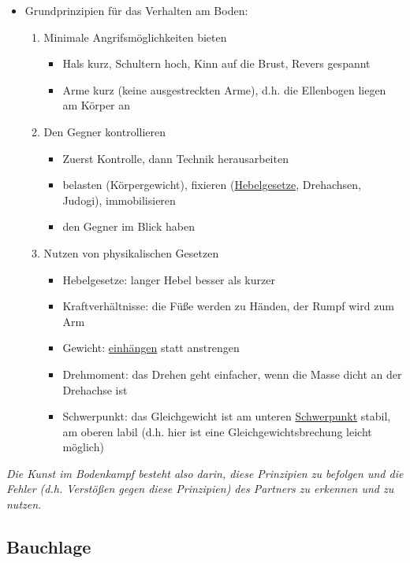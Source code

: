 \documentclass[justified, a4paper, notitlepage, captions=tableheading, nobib]{tufte-handout}
\begin{document}
\begin{itemize}
\item Grundprinzipien für das Verhalten am Boden:
\begin{enumerate}
\item Minimale Angrifsmöglichkeiten bieten
\begin{itemize}
\item Hals kurz, Schultern hoch, Kinn auf die Brust, Revers gespannt
\item Arme kurz (keine ausgestreckten Arme), d.h. die Ellenbogen liegen am Körper an
\end{itemize}
\item Den Gegner kontrollieren
\begin{itemize}
\item Zuerst \label{org696b01a}Kontrolle, dann Technik herausarbeiten
\item \label{org54845fb}belasten (Körpergewicht), \label{orgae947d2}fixieren (\hyperref[orgff04c7c]{Hebelgesetze}, Drehachsen, Judogi), \label{orga3f25db}immobilisieren
\item den Gegner im Blick haben
\end{itemize}
\item \label{org82c5fe1}Nutzen von physikalischen Gesetzen
\begin{itemize}
\item \label{orgff04c7c}Hebelgesetze: langer Hebel besser als kurzer
\item \label{org50f9cf6}Kraftverhältnisse: die Füße werden zu Händen, der Rumpf wird zum Arm
\item \label{org304d37a}Gewicht: \hyperref[org022c76e]{einhängen} statt anstrengen
\item \label{orgd73f2ba}Drehmoment: das Drehen geht einfacher, wenn die Masse dicht an der Drehachse ist
\item \label{org0aaa628}Schwerpunkt: das Gleichgewicht ist am unteren \hyperref[org0aaa628]{Schwerpunkt} stabil, am oberen labil (d.h. hier ist eine \label{org98763b8}Gleichgewichtsbrechung leicht möglich)
\end{itemize}
\end{enumerate}
\end{itemize}

\emph{Die Kunst im Bodenkampf besteht also darin, diese Prinzipien zu befolgen und die Fehler (d.h. Verstößen gegen diese Prinzipien) des Partners zu erkennen und zu nutzen.}

\newpage
\subsection{\label{org59cef52}Bauchlage }
\label{sec:org3399635}
\end{document}
